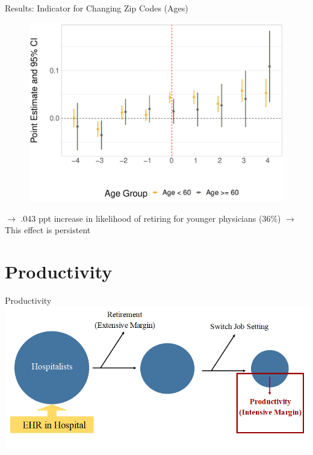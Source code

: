 \documentclass[10pt]{beamer}
\begin{document}
\begin{frame}{Results: Indicator for Changing Zip Codes (Ages)}
\begin{figure}[ht]
    \centering
    \includegraphics[scale=.35]{Objects/Presentation_zip_ages.pdf}
\end{figure}
$\rightarrow$ .043 ppt increase in likelihood of retiring for younger physicians (36\%)
$\rightarrow$ This effect is persistent
\end{frame}





\section{Productivity}





\begin{frame}{Productivity}
\centering
\includegraphics[scale=.45]{Objects/EHR_FlowChart_Productivity.PNG}
\end{frame}
\end{document}
